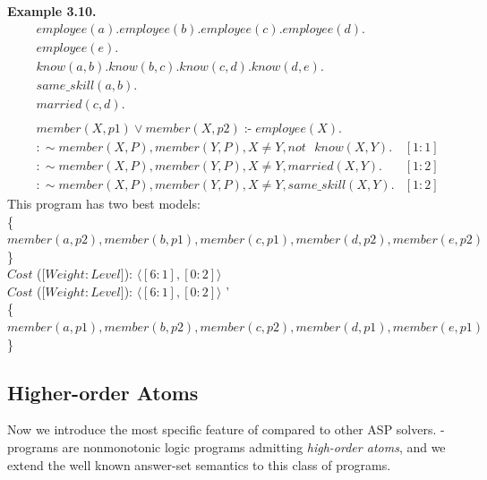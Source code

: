 \documentclass[14pt,a4paper, titlepage]{article}
\DeclareMathOperator{\leftimpl}{:-}
\begin{document}
\textbf{Example 3.10.}
\begin{align*}
& \mathit{employee}(a). \mathit{employee}(b).   \mathit{employee}(c). \mathit{employee(d)}. \\
& \mathit{employee}(e). \\
& \mathit{know}(a,b). \mathit{know}(b,c). \mathit{know}(c,d). \mathit{know}(d,e). \\
& \mathit{same\_skill}(a,b). \\
& \mathit{married(c,d)}. \\
&  \\ 
& \mathit{member}(X,p1) \vee \mathit{member}(X,p2) \leftimpl \mathit{employee}(X).\\
& : \sim \mathit{member}(X,P), \mathit{member}(Y,P), X \neq Y, \mathit{not} \text{ } \mathit{know(X,Y)}. & [1:1] \\
& : \sim  \mathit{member}(X,P), \mathit{member}(Y,P), X \neq Y, \mathit{marrie}d(X,Y). & [1:2]\\
& : \sim member(X,P), member(Y,P), X \neq Y, same\_skill(X,Y). & [1:2] 
\end{align*}
This program has two best models:
\\ \{$\mathit{member}(a,p2), \mathit{member}(b,p1), \mathit{member}(c,p1), \mathit{member}(d,p2), \mathit{member}(e,p2)$\}
\\$\mathit{Cost}$ ($[ \mathit{Weight:Level]}$): $ \langle [6:1],[0:2] \rangle $
\\$\mathit{Cost}$ ($[ \mathit{Weight:Level]}$): $ \langle [6:1],[0:2] \rangle $ '\\
\{$\mathit{member}(a,p1), \mathit{member}(b,p2), \mathit{member}(c,p2), \mathit{member}(d,p1), \mathit{member}(e,p1)$\}

\subsection{Higher-order Atoms}
Now we introduce the most specific feature of \dlvhex{} compared to other ASP solvers. \hex{}-programs are nonmonotonic logic programs admitting \emph{high-order atoms}, and we extend the well known answer-set semantics to this class of programs.
\end{document}
